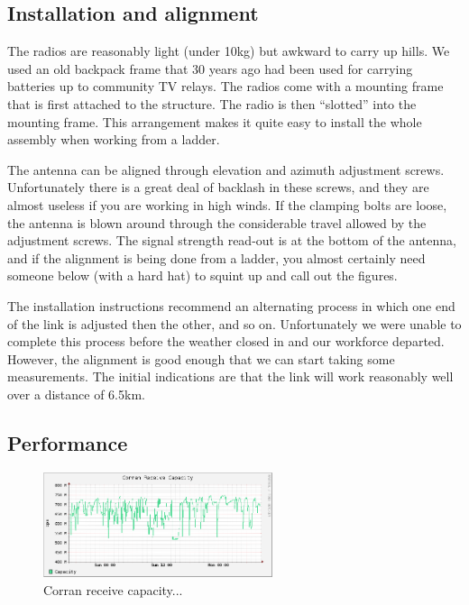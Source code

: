 \subsection{Installation and alignment}
\label{january-2014.-installation-and-alignment}

The radios are reasonably light (under 10kg) but awkward to carry up
hills. We used an old backpack frame that 30 years ago had been used
for carrying batteries up to community TV relays. The radios come with
a mounting frame that is first attached to the structure. The radio is
then ``slotted'' into the mounting frame. This arrangement makes it
quite easy to install the whole assembly when working from a ladder.

The antenna can be aligned through elevation and azimuth
adjustment screws. Unfortunately there is a great deal of backlash in
these screws, and they are almost useless if you are working in high
winds. If the clamping bolts are loose, the antenna is blown around
through the considerable travel allowed by the adjustment screws. The
signal strength read-out is at the bottom of the antenna, and if
the alignment is being done from a ladder, you almost certainly
need someone below (with a hard hat) to squint up and call out
the figures.

The installation instructions recommend an alternating process in which
one end of the link is adjusted then the other, and so
on. Unfortunately we were unable to complete this process before
the weather closed in and our workforce departed. However, the
alignment is good enough that we can start taking some measurements.
The initial indications are that the link will work reasonably well
over a distance of 6.5km.

\subsection{Performance}
\label{performance}

\begin{figure}
\includegraphics[width=0.6\textwidth]{corran-rcvcap}
\caption{Corran receive capacity...}
\end{figure}
